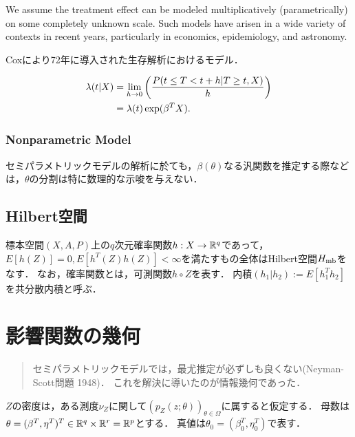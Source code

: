 \documentclass[uplatex,dvipdfmx]{jsreport}
\begin{document}
\begin{tcolorbox}[colframe=ForestGreen, colback=ForestGreen!10!white,breakable,colbacktitle=ForestGreen!40!white,coltitle=black,fonttitle=\bfseries\sffamily,
title=]
    We assume the treatment effect can be modeled multiplicatively (parametrically) on some completely unknown scale.
    Such models have arisen in a wide variety of contexts in recent years, particularly in economics, epidemiology, and astronomy.\cite{Bickel}
\end{tcolorbox}

Coxにより72年に導入された生存解析におけるモデル．

\begin{align*}
    \lambda(t|X)&=\lim_{h\to0}\left(\frac{P(t\le T<t+h|T\ge t,X)}{h}\right)\\
    &=\lambda(t)\exp(\beta^TX).
\end{align*}

\subsection{Nonparametric Model}

セミパラメトリックモデルの解析に於ても，$\beta(\theta)$なる汎関数を推定する際などは，$\theta$の分割は特に数理的な示唆を与えない．

\section{Hilbert空間}

\begin{example}
    標本空間$(X,A,P)$上の$q$次元確率関数$h:X\to\mathbb{R}^q$であって，$E[h(Z)]=0,E[h^T(Z)h(Z)]<\infty$を満たすもの全体はHilbert空間$H_{\mathrm{mb}}$をなす．
    なお，確率関数とは，可測関数$h\circ Z$を表す．
    内積$(h_1|h_2):=E[h_1^Th_2]$を共分散内積と呼ぶ．
\end{example}



\chapter{影響関数の幾何}

\begin{quotation}
    セミパラメトリックモデルでは，最尤推定が必ずしも良くない(Neyman-Scott問題 1948)．
    これを解決に導いたのが情報幾何であった．
\end{quotation}

\begin{notation}
    $Z$の密度は，ある測度$\nu_Z$に関して$(p_Z(z;\theta))_{\theta\in\Omega}$に属すると仮定する．
    母数は$\theta=(\beta^T,\eta^T)^T\in\mathbb{R}^q\times\mathbb{R}^r=\mathbb{R}^p$とする．
    真値は$\theta_0=(\beta_0^T,\eta^T_0)$で表す．
\end{notation}
\end{document}
